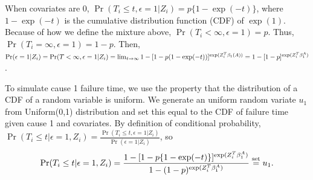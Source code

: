 When covariates are $0$, $\Pr(T_i \le t, \epsilon = 1|Z_i) = p\{1-\exp(-t)\}$, where $1-\exp(-t)$ is the cumulative distribution function (CDF) of $\exp(1)$. %
Because of how we define the mixture above, $\Pr(T_i <\infty, \epsilon = 1) = p$. Thus, $\Pr(T_i = \infty, \epsilon = 1) = 1-p$. Then,
\label{eq_sim1}
$\Pr(\epsilon = 1|Z_i)  = \Pr(T < \infty, \epsilon = 1|Z_i) 
  = \lim_{{t \to \infty}} 1- [1-p(1-\exp(-t))]^{\exp(Z^T_i \beta_1(A))}   
  = 1-[1-p]^{\exp(Z_i^T\beta_1^A)}$.

To simulate cause 1 failure time, we use the property that the distribution of a CDF of a random variable is uniform. We generate an uniform random variate $u_1$ from Uniform(0,1) distribution and set this equal to the CDF of failure time given cause 1 and covariates. By definition of conditional probability, $\Pr(T_i \le t|\epsilon = 1, Z_i) = \frac{\Pr(T_i \le t, \epsilon = 1|Z_i)}{\Pr(\epsilon = 1|Z_i)}$, so 
$$\Pr(T_i \le t| \epsilon = 1,Z_i) = \frac{1-[1-p\{1-\exp(-t)\}]^{\exp(Z_i^T\beta_1^A)}}{1-(1-p)^{\exp(Z_i^T\beta_1^A)}} \overset{\text{set}}{=} u_1.$$

